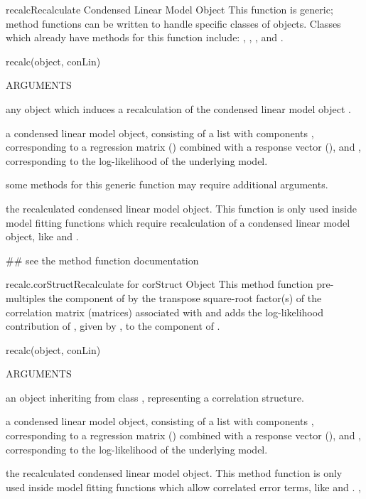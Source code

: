 \documentclass[pdftex]{article} \usepackage{url,graphicx}
\begin{document}
\begin{Helpfile}{recalc}{Recalculate Condensed Linear Model Object}
This function is generic; method functions can be written to handle
specific classes of objects. Classes which already have methods for
this function include: , ,
, and .
\begin{Example}
recalc(object, conLin)
\end{Example}
\begin{Argument}{ARGUMENTS}
\item[\Co{object:}]
any object which induces a recalculation of the condensed
linear model object .
\item[\Co{conLin:}]
a condensed linear model object, consisting of a list
with components , corresponding to a regression matrix
() combined with a response vector (), and
, corresponding to the log-likelihood of the
underlying model.
\item[\Co{...:}]
some methods for this generic function may require
additional arguments.
\end{Argument}
the recalculated condensed linear model object.
 This function is only used inside model fitting functions
which require recalculation of a condensed linear model object, like
 and .
\need 15pt
\vspace{-16pt} 
\begin{Example}
## see the method function documentation
\end{Example}
\end{Helpfile}
\begin{Helpfile}{recalc.corStruct}{Recalculate for corStruct Object}
This method function pre-multiples the  component of
 by the transpose square-root factor(s) of the
correlation matrix (matrices) associated with  and adds
the log-likelihood contribution of , given by
, to the  component of
.
\begin{Example}
recalc(object, conLin)
\end{Example}
\begin{Argument}{ARGUMENTS}
\item[\Co{object:}]
an object inheriting from class ,
representing a correlation structure.
\item[\Co{conLin:}]
a condensed linear model object, consisting of a list
with components , corresponding to a regression matrix
() combined with a response vector (), and
, corresponding to the log-likelihood of the
underlying model.
\end{Argument}
the recalculated condensed linear model object.
 This method function is only used inside model fitting functions
which allow correlated error terms, like  and .
, 
\end{Helpfile}
\end{document}
